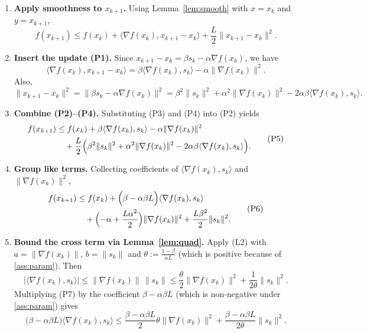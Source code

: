 \documentclass{article}
\begin{document}
\begin{enumerate}
\item\textbf{Apply smoothness to $x_{k+1}$.}  
Using Lemma~\ref{lem:smooth} with $x=x_{k}$ and $y=x_{k+1}$,
\[
f(x_{k+1})\le f(x_{k})+\langle \nabla f(x_{k}),x_{k+1}-x_{k}\rangle+\frac{L}{2}\|x_{k+1}-x_{k}\|^{2}. \tag{P2}
\]

\item\textbf{Insert the update (P1).}  
Since $x_{k+1}-x_{k}= \beta s_{k}-\alpha \nabla f(x_{k})$, we have
\[
\langle \nabla f(x_{k}),x_{k+1}-x_{k}\rangle
= \beta\langle \nabla f(x_{k}),s_{k}\rangle-\alpha\|\nabla f(x_{k})\|^{2}. \tag{P3}
\]
Also,
\[
\|x_{k+1}-x_{k}\|^{2}= \|\beta s_{k}-\alpha \nabla f(x_{k})\|^{2}
= \beta^{2}\|s_{k}\|^{2}+\alpha^{2}\|\nabla f(x_{k})\|^{2}
-2\alpha\beta\langle \nabla f(x_{k}),s_{k}\rangle. \tag{P4}
\]

\item\textbf{Combine (P2)–(P4).}  
Substituting (P3) and (P4) into (P2) yields
\[
\begin{aligned}
f(x_{k+1})
&\le f(x_{k})+\beta\langle \nabla f(x_{k}),s_{k}\rangle-\alpha\|\nabla f(x_{k})\|^{2}\\
&\quad+\frac{L}{2}\Bigl(\beta^{2}\|s_{k}\|^{2}+\alpha^{2}\|\nabla f(x_{k})\|^{2}
-2\alpha\beta\langle \nabla f(x_{k}),s_{k}\rangle\Bigr).
\end{aligned}
\tag{P5}
\]

\item\textbf{Group like terms.}  
Collecting coefficients of $\langle \nabla f(x_{k}),s_{k}\rangle$ and $\|\nabla f(x_{k})\|^{2}$,
\[
\begin{aligned}
f(x_{k+1})
&\le f(x_{k})+\Bigl(\beta-\alpha\beta L\Bigr)\langle \nabla f(x_{k}),s_{k}\rangle\\
&\quad+\Bigl(-\alpha+\frac{L\alpha^{2}}{2}\Bigr)\|\nabla f(x_{k})\|^{2}
+\frac{L\beta^{2}}{2}\|s_{k}\|^{2}.
\end{aligned}
\tag{P6}
\]

\item\textbf{Bound the cross term via Lemma~\ref{lem:quad}.}  
Apply (L2) with $a=\|\nabla f(x_{k})\|$, $b=\|s_{k}\|$ and $\theta:=\frac{1-\beta}{\alpha L}$ (which is positive because of \eqref{ass:param}). Then
\[
\bigl|\langle \nabla f(x_{k}),s_{k}\rangle\bigr|
\le \|\nabla f(x_{k})\|\,\|s_{k}\|
\le \frac{\theta}{2}\|\nabla f(x_{k})\|^{2}
+\frac{1}{2\theta}\|s_{k}\|^{2}.
\tag{P7}
\]
Multiplying (P7) by the coefficient $\beta-\alpha\beta L$ (which is non‑negative under \eqref{ass:param}) gives
\[
\bigl(\beta-\alpha\beta L\bigr)\langle \nabla f(x_{k}),s_{k}\rangle
\le \frac{\beta-\alpha\beta L}{2}\theta\|\nabla f(x_{k})\|^{2}
+\frac{\beta-\alpha\beta L}{2\theta}\|s_{k}\|^{2}.
\tag{P8}
\]


\end{enumerate}
\end{document}
